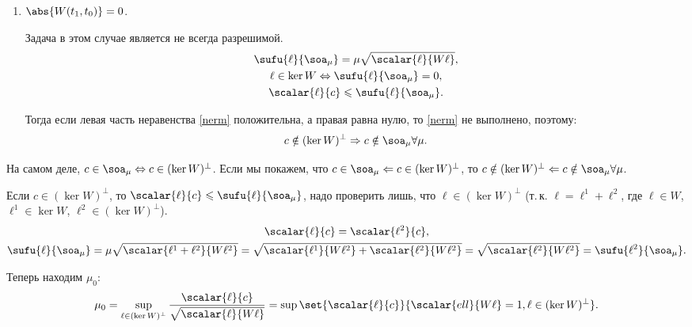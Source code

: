 \begin{enumerate}
	\item $\abs{W(t_1, t_0)} = 0$.

  Задача в этом случае является не всегда разрешимой.
  \begin{gather}
	  \notag \sufu{\ell}{\soa_\mu} = \mu \sqrt{\scalar{\ell}{W \ell}},\\
	  \notag \ell \in \ker W \Leftrightarrow \sufu{\ell}{\soa_\mu} = 0,\\
	  \scalar{\ell}{c} \leqslant \sufu{\ell}{\soa_\mu} \label{nerm}.
  \end{gather}

  Тогда если левая часть неравенства \eqref{nerm} положительна, а правая равна нулю,
  то \eqref{nerm} не выполнено, поэтому:
  \begin{equation*}
	  c \notin (\ker W)^\perp \Rightarrow c \notin \soa_\mu \forall \mu.
  \end{equation*}

\end{enumerate}

На самом деле, $c \in \soa_\mu \Leftrightarrow c \in (\ker W)^\perp$.
Если мы покажем, что
$c \in \soa_\mu \Leftarrow c \in (\ker W)^\perp$,
то $c \notin (\ker W)^\perp \Leftarrow c \notin \soa_\mu \forall\mu$.

Если $c \in (\ker W)^\perp$,
то $\scalar{\ell}{c} \leqslant \sufu{\ell}{\soa_\mu}$, надо проверить лишь,
что $\ell \in (\ker W)^\perp$ (т.\,к. $\ell = \ell^1 + \ell^2$,
где $\ell \in W$, $\ell^1 \in \ker W$, $\ell^2 \in (\ker W)^\perp$).
\begin{gather*}
	\scalar{\ell}{c} = \scalar{\ell^2}{c},\\
	\sufu{\ell}{\soa_\mu} =
	\mu \sqrt{\scalar{\ell^1 + \ell^2}{W \ell^2}} =
	\sqrt{\scalar{\ell^1}{W \ell^2} + \scalar{\ell^2}{W \ell^2}} =
	\sqrt{\scalar{\ell^2}{W \ell^2}} =
	\sufu{\ell^2}{\soa_\mu}.
\end{gather*}

Теперь находим $\mu_0$:
\begin{equation*}
	\mu_0 = \sup_{\ell \in (\ker W)^\perp}
	  \dfrac{\scalar{\ell}{c}}{\sqrt{\scalar{\ell}{W \ell}}} =
	\sup\set{\scalar{\ell}{c}}{\scalar{ell}{W \ell} = 1, \ell \in (\ker W)^\perp}.
\end{equation*}

